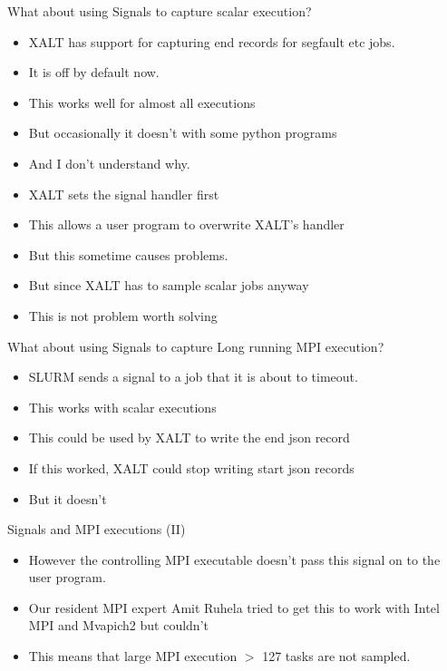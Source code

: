 \documentclass{beamer}
\begin{document}
\begin{frame}{What about using Signals to capture scalar execution?}
  \begin{itemize}
    \item XALT has support for capturing end records for segfault etc
      jobs.
    \item It is off by default now.
    \item This works well for almost all executions
    \item But occasionally it doesn't with some python programs
    \item And I don't understand why.
    \item XALT sets the signal handler first
    \item This allows a user program to overwrite XALT's handler
    \item But this sometime causes problems.
    \item But since XALT has to sample scalar jobs anyway 
    \item This is not problem worth solving
  \end{itemize}
\end{frame}

\begin{frame}{What about using Signals to capture Long running MPI execution?}
  \begin{itemize}
    \item SLURM sends a signal to a job that it is about to timeout.
    \item This works with scalar executions
    \item This could be used by XALT to write the end json record
    \item If this worked, XALT could stop writing start json records 
    \item But it doesn't
  \end{itemize}
\end{frame}

\begin{frame}{Signals and MPI executions (II)}
  \begin{itemize}
    \item However the controlling MPI executable doesn't pass this
      signal on to the user program.
    \item Our resident MPI expert Amit Ruhela tried to get this to
      work with Intel MPI and Mvapich2 but couldn't
    \item This means that large MPI execution $>$ 127 tasks are not sampled.
  \end{itemize}
\end{frame}
\end{document}
